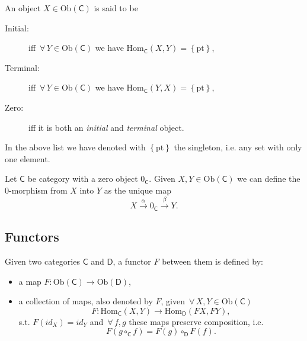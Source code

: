 \begin{defn}
	An object $X \in \mathrm{Ob} \left(\mathsf{C}\right)$ is said to be
	\begin{description}
		\item[Initial:] iff $\,\forall\, Y \in \mathrm{Ob} \left(\mathsf{C}\right)$ we have $\mathrm{Hom}_{\mathsf{C}} \left( X, Y \right) = \left\{ \mathrm{pt} \right\}$,
		\item[Terminal:] iff $\,\forall\, Y \in \mathrm{Ob} \left(\mathsf{C}\right)$ we have $\mathrm{Hom}_{\mathsf{C}} \left( Y, X \right) = \left\{ \mathrm{pt} \right\}$,
		\item[Zero:] iff it is both an {\em initial} and {\em terminal} object.
	\end{description} 
	In the above list we have denoted with $\left\{ \mathrm{pt} \right\}$ the singleton, i.e. any set with only one element.
\end{defn}

\begin{defn}
	Let $\mathsf{C}$ be category with a zero object $0_{\mathsf{C}}$.
	Given $X, Y \in \mathrm{Ob} \left(\mathsf{C}\right)$ we can define the
	$0$-morphism from $X$ into $Y$ as the unique map
	\begin{equation}
		X \xrightarrow{\alpha} 0_{\mathsf{C}} \xrightarrow{\beta} Y
	.\end{equation} 
\end{defn}

\subsection{Functors}

\begin{defn}[Functor]
	Given two categories $\mathsf{C}$ and $\mathsf{D}$, a functor $F$ between them is defined by:
	\begin{itemize}
		\item a map $F: \mathrm{Ob} \left(\mathsf{C}\right) \to \mathrm{Ob} \left(\mathsf{D}\right)$,
		\item a collection of maps, also denoted by $F$, given $\,\forall\, X,Y \in \mathrm{Ob} \left(\mathsf{C}\right)$
			\begin{equation}
			F: \mathrm{Hom}_{\mathsf{C}} \left( X, Y \right) \to \mathrm{Hom}_{\mathsf{D}} \left( FX, FY \right) 
			,\end{equation} 
			s.t. $F(id_X) = id_Y$ and $\,\forall\, f,g$ these maps preserve composition, i.e. 
			\begin{equation}
			 F \left( g \circ_{\mathsf{C}} f \right) = F(g) \circ_{\mathsf{D}} F(f)
			.\end{equation}
	\end{itemize}
\end{defn}

